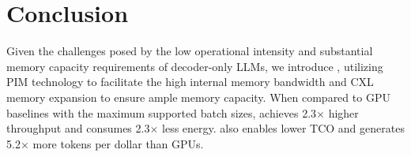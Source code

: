 \section{Conclusion}

Given the challenges posed by the low operational intensity and substantial memory capacity requirements of decoder-only LLMs, we introduce \att{}, utilizing PIM technology to facilitate the high internal memory bandwidth and CXL memory expansion to ensure ample memory capacity. 
When compared to GPU baselines with the maximum supported batch sizes, \att{} achieves 2.3$\times$ higher throughput and consumes 2.3$\times$ less energy. \att{} also enables lower TCO and generates 5.2$\times$ more tokens per dollar than GPUs.

